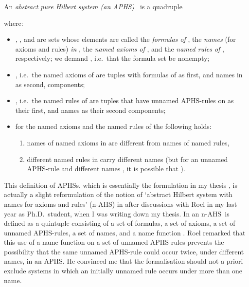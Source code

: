\documentclass[envcountsame,runningheads]{llncs}
\newcommand{\APHS}{A\hspace*{-0.3pt}P\hspace*{-0.6pt}H\hspace*{-0.4pt}S}
\newcommand{\nAHS}{\mbox{n-AHS}}
\begin{document}
\begin{definition} \normalfont
   \label{def:APHS}
An \emph{abstract pure Hilbert system (an \APHS)~} is a quadruple
   
  where:
\begin{itemize}
\item[]  
      , ,  and  are sets
      whose elements are called
      the {\em formulas of\/} ,
      the {\em names\/} (for axioms and rules) {\em in\/} ,
      the {\em named axioms of\/} ,
      and the {\em named rules of \/}, respectively;
      we demand , i.e.\ that
      the formula set be nonempty;
\item[] 
      , 
      i.e.\ the named axioms of  are tuples with
      formulas of  as first, and names in 
      as second, components;
\item[] 
      ,
      i.e.\ the named rules of  are tuples that have
      unnamed \APHS-rules on  as their first, and names
      as their second components; 
\item[] 
      for the named axioms and the named rules of 
      the following holds:
\begin{enumerate}
        \renewcommand{\labelenumi}{(\roman{enumi})}
\item  names of named axioms in  are different from names 
          of named rules,
\item different named rules in  carry different names
          (but for an unnamed APHS-rule  and different
           names , it is possible that    
           ).
\end{enumerate}
\begin{comment}

i.e.\ names of named axioms are different from names 
      of named rules, and

i.e.\ different rules are differently named in  
      (but it is not excluded that the 
      same rule may occur with different names in ).
\end{comment}
\end{itemize}    
\end{definition}


This definition of \APHS{s}, which is essentially the formulation in
my thesis \cite{grab:2005}, is actually a slight reformulation of the notion of
`abstract Hilbert system with names for axioms and rules' (\nAHS)
in \cite{grab:2003} after discussions with Roel in my last year
as Ph.D.~student, when I was writing down my thesis.
In \cite{grab:2003} an \nAHS\ is defined as 
a quintuple 
consisting of a set  of formulas, a set 
of axioms, a set  of unnamed \APHS-rules,
a set  of names, and a name function
.
Roel remarked that this use of a name function on a set of unnamed \APHS-rules 
prevents the possibility that the same unnamed \APHS-rule could occur twice,
under different names, in an \APHS. He convinced me that the formalisation should
not a priori exclude systems in which an initially unnamed rule occurs
under more than one name. 
\end{document}
